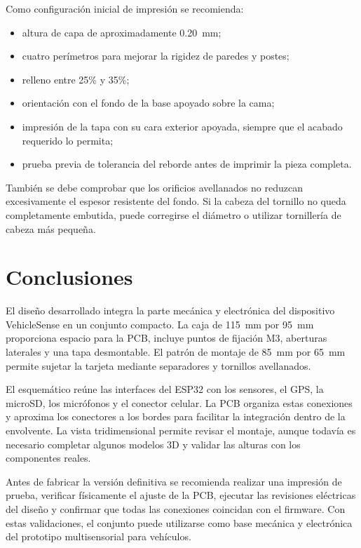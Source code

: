 \documentclass[11pt,a4paper]{article}
\begin{document}
Como configuración inicial de impresión se recomienda:

\begin{itemize}
    \item altura de capa de aproximadamente \SI{0.20}{\milli\metre};
    \item cuatro perímetros para mejorar la rigidez de paredes y postes;
    \item relleno entre 25\% y 35\%;
    \item orientación con el fondo de la base apoyado sobre la cama;
    \item impresión de la tapa con su cara exterior apoyada, siempre que el acabado requerido lo permita;
    \item prueba previa de tolerancia del reborde antes de imprimir la pieza completa.
\end{itemize}

También se debe comprobar que los orificios avellanados no reduzcan excesivamente el
espesor resistente del fondo. Si la cabeza del tornillo no queda completamente embutida,
puede corregirse el diámetro o utilizar tornillería de cabeza más pequeña.

\section{Conclusiones}

El diseño desarrollado integra la parte mecánica y electrónica del dispositivo
VehicleSense en un conjunto compacto. La caja de \SI{115}{\milli\metre} por
\SI{95}{\milli\metre} proporciona espacio para la PCB, incluye puntos de fijación M3,
aberturas laterales y una tapa desmontable. El patrón de montaje de
\SI{85}{\milli\metre} por \SI{65}{\milli\metre} permite sujetar la tarjeta mediante
separadores y tornillos avellanados.

El esquemático reúne las interfaces del ESP32 con los sensores, el GPS, la microSD, los
micrófonos y el conector celular. La PCB organiza estas conexiones y aproxima los
conectores a los bordes para facilitar la integración dentro de la envolvente. La vista
tridimensional permite revisar el montaje, aunque todavía es necesario completar algunos
modelos 3D y validar las alturas con los componentes reales.

Antes de fabricar la versión definitiva se recomienda realizar una impresión de prueba,
verificar físicamente el ajuste de la PCB, ejecutar las revisiones eléctricas del diseño
y confirmar que todas las conexiones coincidan con el firmware. Con estas validaciones,
el conjunto puede utilizarse como base mecánica y electrónica del prototipo multisensorial
para vehículos.
\end{document}
